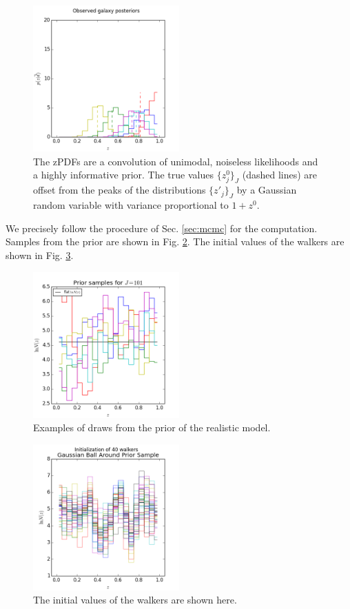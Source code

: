\documentclass[preprint]{aastex}
\begin{document}
\begin{figure}
\includegraphics[width=0.5\textwidth]{null/samplepzs.png}
\caption{The zPDFs are a convolution of unimodal, noiseless likelihoods and a highly informative prior.  The true values $\{z^{0}_{j}\}_{J}$ (dashed lines) are offset from the peaks of the distributions $\{z'_{j}\}_{J}$ by a Gaussian random variable with variance proportional to $1+z^{0}$.}
\label{fig:nullpzs}
\end{figure}

We precisely follow the procedure of Sec. \ref{sec:mcmc} for the computation.  Samples from the prior are shown in Fig. \ref{fig:nullprior}.  The initial values of the walkers are shown in Fig. \ref{fig:nullival}.

\begin{figure}
\includegraphics[width=0.5\textwidth]{null/priorsamps.png}
\caption{Examples of draws from the prior of the realistic model.}
\label{fig:nullprior}
\end{figure}

\begin{figure}
\includegraphics[width=0.5\textwidth]{null/initializations.png}
\caption{The initial values of the walkers are shown here.}
\label{fig:nullival}
\end{figure}
\end{document}
